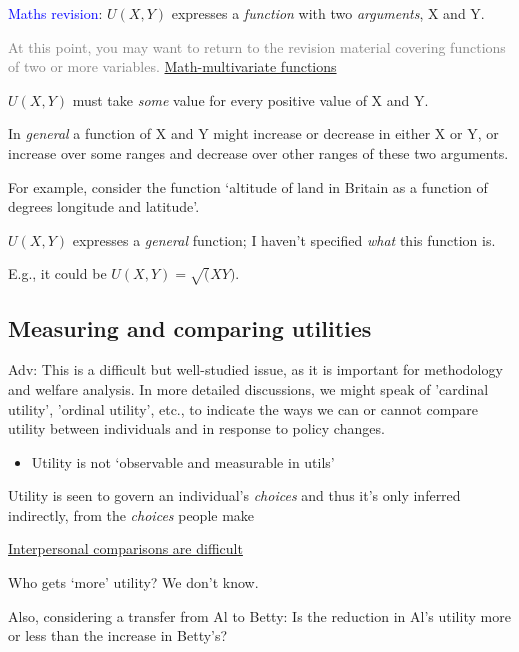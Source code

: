 \documentclass[]{article}
\providecommand{\tightlist}{%
  \setlength{\itemsep}{0pt}\setlength{\parskip}{0pt}}
\begin{document}
\textcolor{blue}{Maths revision}: \(U(X,Y)\) expresses a \emph{function} with two \emph{arguments}, X and Y.

\textcolor{gray}{At this point, you may want to return to the revision material covering functions of two or more variables.} \protect\hyperlink{multivar-functions}{Math-multivariate functions}

\(U(X,Y)\) must take \emph{some} value for every positive value of X and Y.

In \emph{general} a function of X and Y might increase or decrease in either X or Y, or increase over some ranges and decrease over other ranges of these two arguments.

For example, consider the function `altitude of land in Britain as a function of degrees longitude and latitude'.

\(U(X,Y)\) expresses a \emph{general} function; I haven't specified \emph{what} this function is.

E.g., it could be \(U(X,Y)=\sqrt(XY)\).

\hypertarget{measuring-and-comparing-utilities}{%
\subsection{Measuring and comparing utilities}\label{measuring-and-comparing-utilities}}

\textcolor{RawSienna}{Adv: This is a difficult but well-studied issue, as it is important for methodology and welfare analysis. In more detailed discussions, we might speak of 'cardinal utility', 'ordinal utility', etc.,  to indicate the ways we can or cannot compare utility between individuals and in response to policy changes.}

\begin{itemize}
\tightlist
\item
  Utility is not `observable and measurable in utils'
\end{itemize}

Utility is seen to govern an individual's \emph{choices} and thus it's only inferred indirectly, from the \emph{choices} people make

\bigskip

\underline{Interpersonal comparisons are difficult}

Who gets `more' utility? We don't know.

Also, considering a transfer from Al to Betty: Is the reduction in Al's utility more or less than the increase in Betty's?
\end{document}
